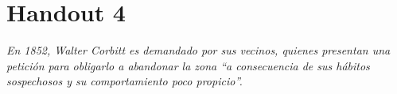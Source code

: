 \chapter{Handout 4}

\emph{En 1852, Walter Corbitt es demandado por sus vecinos, quienes presentan
una petición para obligarlo a abandonar la zona “a consecuencia de sus hábitos
sospechosos y su comportamiento poco propicio”.}

